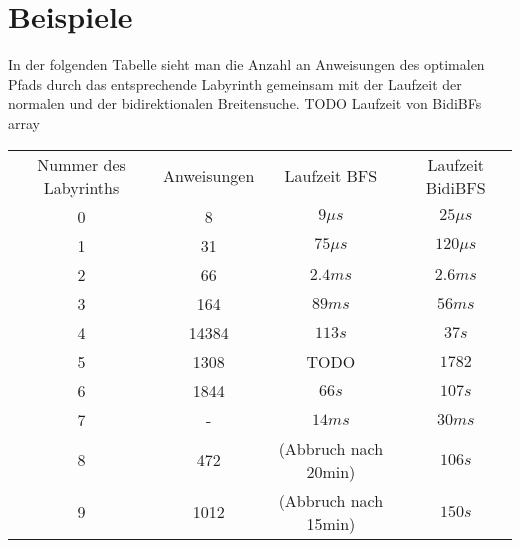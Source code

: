 \documentclass[a4paper,10pt,ngerman]{scrartcl}
\begin{document}
    \section{Beispiele}
    In der folgenden Tabelle sieht man die Anzahl an Anweisungen des optimalen Pfads durch das entsprechende Labyrinth gemeinsam mit der Laufzeit der normalen und der bidirektionalen Breitensuche. TODO Laufzeit von BidiBFs array
    \begin{tabular}{||c | c | c | c||}
        Nummer des Labyrinths & Anweisungen & Laufzeit BFS         & Laufzeit BidiBFS \\
        0                     & 8           & $9 \mu s$            & $25 \mu s$       \\
        \hline
        1                     & 31          & $75 \mu s$           & $120 \mu s$      \\
        \hline
        2                     & 66          & $2.4 ms$             & $2.6 ms$         \\
        \hline
        3                     & 164         & $89 ms$              & $56 ms$          \\
        \hline
        4                     & 14384       & $113 s$              & $37 s$           \\
        \hline
        5                     & 1308        & TODO                 & $1782$           \\
        \hline
        6                     & 1844        & $66 s$               & $107 s$          \\
        \hline
        7                     & -           & $14ms$               & $30ms$           \\
        \hline
        8                     & 472         & (Abbruch nach 20min) & $106 s$          \\
        \hline
        9                     & 1012        & (Abbruch nach 15min) & $150 s$          \\
    \end{tabular}
\end{document}
